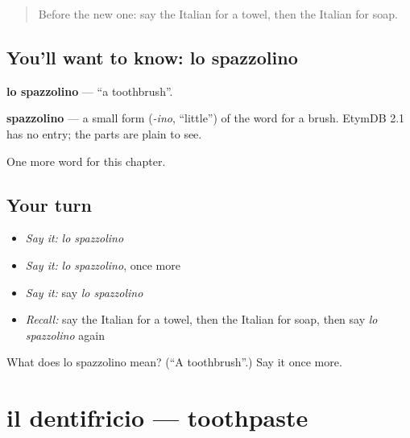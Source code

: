 \label{lesson:IT-C96-spazzolino}



\begin{quote}
Before the new one: say the Italian for a towel, then the Italian for soap.
\end{quote}

\subsection*{You'll want to know: lo spazzolino}
\textbf{lo spazzolino} — \textquotedblleft{}a toothbrush\textquotedblright{}.

\begin{cousinweb}
\textbf{spazzolino} — a small form (\emph{-ino}, \textquotedblleft{}little\textquotedblright{}) of the word for a brush. EtymDB 2.1 has no entry; the parts are plain to see.
\end{cousinweb}

\begin{grammarlens}[title={What you've built}]
One more word for this chapter.
\end{grammarlens}

\subsection*{Your turn}
\begin{itemize}
\raggedright
  \item \emph{Say it:} \emph{lo spazzolino}
  \item \emph{Say it:} \emph{lo spazzolino}, once more
  \item \emph{Say it:} say \emph{lo spazzolino}
  \item \emph{Recall:} say the Italian for a towel, then the Italian for soap, then say \emph{lo spazzolino} again
\end{itemize}

\begin{tcolorbox}[breakable,colback=teal!4,colframe=teal!35!black,title={Before you move on}]
What does lo spazzolino mean? (\textquotedblleft{}A toothbrush\textquotedblright{}.) Say it once more.
\end{tcolorbox}
\section[il dentifricio]{il dentifricio — toothpaste}

\label{lesson:IT-C96-dentifricio}



